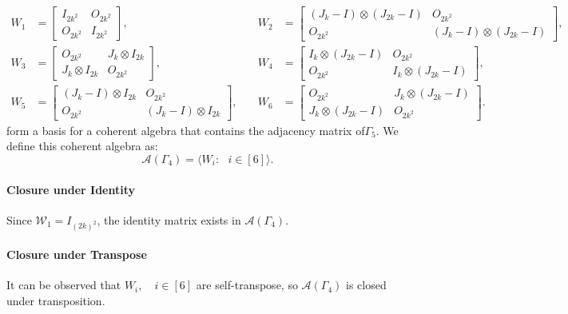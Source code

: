 \[
\begin{aligned}
W_1 &= 
\begin{bmatrix}
I_{2k^2} & O_{2k^2} \\
O_{2k^2} & I_{2k^2}
\end{bmatrix},
& \quad
W_2 &= 
\begin{bmatrix}
(J_k - I) \otimes (J_{2k} - I) & O_{2k^2} \\
O_{2k^2} & (J_k - I) \otimes (J_{2k} - I)
\end{bmatrix}, \\[1em]
W_3 &= 
\begin{bmatrix}
O_{2k^2} & J_k \otimes I_{2k} \\
J_k \otimes I_{2k} & O_{2k^2}
\end{bmatrix},
& \quad
W_4 &= 
\begin{bmatrix}
I_k \otimes (J_{2k} - I) & O_{2k^2} \\
O_{2k^2} & I_k \otimes (J_{2k} - I)
\end{bmatrix}, \\[1em]
W_5 &= 
\begin{bmatrix}
(J_k - I) \otimes I_{2k} & O_{2k^2} \\
O_{2k^2} & (J_k - I) \otimes I_{2k}
\end{bmatrix},
& \quad
W_6 &= 
\begin{bmatrix}
O_{2k^2} & J_k \otimes (J_{2k} - I) \\
J_k \otimes (J_{2k} - I) & O_{2k^2}
\end{bmatrix}.
\end{aligned}
\]
form a basis for a coherent algebra that contains the adjacency matrix of$\Gamma_5$. We define this coherent algebra as:
\begin{equation*}
    \mathcal{A}(\Gamma_4) = \langle W_i: \text{ }i\in[6]\rangle.
\end{equation*}


\paragraph{Closure under Identity}
Since $\mathcal{W}_1 = I_{(2k)^2}$, the identity matrix exists in $\mathcal{A}(\Gamma_4)$.

\paragraph{Closure under Transpose}
It can be observed that $W_i, \quad i\in[6]$ are self-transpose, so $\mathcal{A}(\Gamma_4)$ is closed under transposition.

